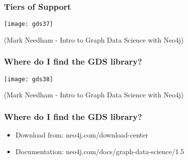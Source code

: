 \begin{frame}[fragile]\frametitle{Tiers of Support}

\begin{center}
\texttt{[image: gds37]}

{\tiny (Mark Needham - Intro to Graph Data Science with Neo4j)}

\end{center}

\end{frame}

\begin{frame}[fragile]\frametitle{Where do I find the GDS library?}

\begin{center}
\texttt{[image: gds38]}

{\tiny (Mark Needham - Intro to Graph Data Science with Neo4j)}

\end{center}

\end{frame}

\begin{frame}[fragile]\frametitle{Where do I find the GDS library?}

\begin{itemize}
\item Download from: neo4j.com/download-center
\item Documentation: neo4j.com/docs/graph-data-science/1.5
\end{itemize}

\end{frame}



